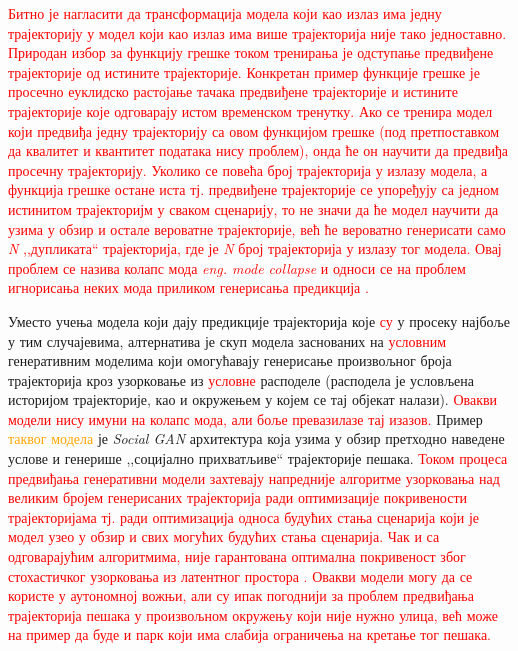 \documentclass[11pt,oneside]{memoir}
\begin{document}
\textcolor{red}{Битно је нагласити да трансформација модела који као излаз има једну трајекторију у модел који као излаз има више трајекторија није тако једноставно.
Природан избор за функцију грешке током тренирања је одступање предвиђене трајекторије од истините трајекторије. Конкретан пример
функције грешке је просечно еуклидско растојање тачака предвиђене трајекторије и истините трајекторије које одговарају истом временском тренутку. Ако
се тренира модел који предвиђа једну трајекторију са овом функцијом грешке (под претпоставком да квалитет и квантитет података нису проблем), 
онда ће он научити да предвиђа просечну трајекторију. Уколико се повећа број трајекторија у излазу модела, а функција грешке остане иста тј. предвиђене
трајекторије се упоређују са једном истинитом трајекторијм у сваком сценарију, то не значи да ће модел научити да узима у обзир и остале
вероватне трајекторије, већ ће вероватно генерисати само \textit{N} ,,дупликата`` трајекторија, где је \textit{N} број трајекторија у излазу 
тог модела. Овај проблем се назива колапс мода \textit{eng. mode collapse} и односи се на проблем игнорисања неких мода приликом генерисања предикција 
\cite{overcoming_mode_collapse}.}

Уместо учења модела који дају предикције трајекторија које \textcolor{red}{су} у просеку најбоље у тим случајевима, 
алтернатива је скуп модела заснованих на \textcolor{red}{условним} генеративним моделима који
омогућавају генерисање произвољног броја трајекторија кроз узорковање из \textcolor{red}{условне} расподеле 
(расподела је условљена историјом трајекторије, као и окружењем у којем се тај објекат налази). \textcolor{red}{Овакви модели нису имуни на колапс мода,
али боље превазилазе тај изазов.}
Пример \textcolor{orange}{таквог модела} је \textit{Social GAN} \cite{social_gan} архитектура која узима у обзир претходно наведене услове и генерише ,,социјално прихватљиве`` 
трајекторије пешака. \textcolor{red}{Током процеса предвиђања генеративни модели захтевају напредније алгоритме узорковања над великим бројем генерисаних
трајекторија ради оптимизације покривености трајекторијама тј. ради оптимизација 
односа будућих стања сценарија који је модел узео у обзир и свих могућих будућих стања сценарија. Чак и са одговарајућим алгоритмима,
није гарантована оптимална покривеност због стохастичког узорковања из латентног простора \cite{tnt}. Овакви модели могу да се користе
у аутономној вожњи, али су ипак погоднији за
проблем предвиђања трајекторија пешака у произвољном окружењу који није нужно улица, већ може на пример да буде и парк који има слабија ограничења
на кретање тог пешака.}
\end{document}
